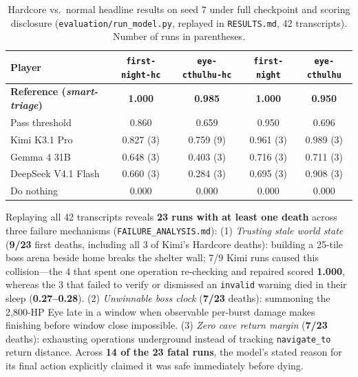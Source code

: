 \documentclass[10pt,letterpaper]{article}
\begin{document}
\begin{table}[t]
\centering
\caption{Hardcore vs.\ normal headline results on seed 7 under full checkpoint and scoring disclosure (\texttt{evaluation/run\_model.py}, replayed in \texttt{RESULTS.md}, 42 transcripts). Number of runs in parentheses.}
\label{tab:hardcore}
\begin{tabular}{lcccc}
\toprule
Player & \texttt{first-night-hc} & \texttt{eye-cthulhu-hc} & \texttt{first-night} & \texttt{eye-cthulhu} \\
\midrule
\textbf{Reference (\textit{smart-triage})} & \textbf{1.000} & \textbf{0.985} & \textbf{1.000} & \textbf{0.950} \\
Pass threshold & 0.860 & 0.659 & 0.950 & 0.696 \\
\midrule
Kimi K3.1 Pro & 0.827 (3) & 0.759 (9) & 0.961 (3) & 0.989 (3) \\
Gemma 4 31B & 0.648 (3) & 0.403 (3) & 0.716 (3) & 0.711 (3) \\
DeepSeek V4.1 Flash & 0.660 (3) & 0.284 (3) & 0.695 (3) & 0.908 (3) \\
Do nothing & 0.000 & 0.000 & 0.000 & 0.000 \\
\bottomrule
\end{tabular}
\end{table}

Replaying all 42 transcripts reveals \textbf{23 runs with at least one death} across three failure mechanisms (\texttt{FAILURE\_ANALYSIS.md}):
(1) \emph{Trusting stale world state} (\textbf{9/23} first deaths, including all 3 of Kimi's Hardcore deaths): building a 25-tile boss arena beside home breaks the shelter wall; 7/9 Kimi runs caused this collision---the 4 that spent one operation re-checking and repaired scored \textbf{1.000}, whereas the 3 that failed to verify or dismissed an \texttt{invalid} warning died in their sleep (\textbf{0.27--0.28}).
(2) \emph{Unwinnable boss clock} (\textbf{7/23} deaths): summoning the 2,800-HP Eye late in a window when observable per-burst damage makes finishing before window close impossible.
(3) \emph{Zero cave return margin} (\textbf{7/23} deaths): exhausting operations underground instead of tracking \texttt{navigate\_to} return distance. Across \textbf{14 of the 23 fatal runs}, the model's stated reason for its final action explicitly claimed it was safe immediately before dying.
\end{document}

